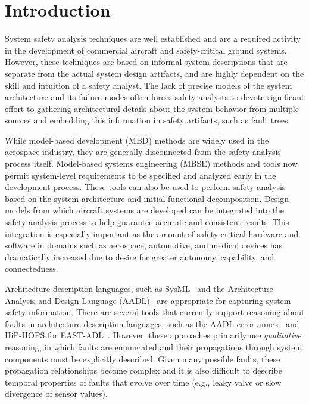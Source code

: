 \section{Introduction}

System safety analysis techniques are well established and are a required activity in the development of commercial aircraft and safety-critical ground systems. However, these techniques are based on informal system descriptions that are separate from the actual system design artifacts, and are highly dependent on the skill and intuition of a safety analyst. The lack of precise models of the system architecture and its failure modes often forces safety analysts to devote significant effort to gathering architectural details about the system behavior from multiple sources and embedding this information in safety artifacts, such as fault trees.

While model-based development (MBD) methods are widely used in the aerospace industry, they are generally disconnected from the safety analysis process itself. Model-based systems engineering (MBSE) methods and tools  now permit system-level requirements to be specified and analyzed early in the development process. These tools can also be used to perform safety analysis based on the system architecture and initial functional decomposition. Design models from which aircraft systems are developed can be integrated into the safety analysis process to help guarantee accurate and consistent results. This integration is especially important as the amount of safety-critical hardware and software in domains such as aerospace, automotive, and medical devices has dramatically increased due to desire for greater autonomy, capability, and connectedness.

Architecture description languages, such as SysML~\cite{} and the Architecture Analysis and Design Language (AADL)~\cite{} are appropriate for capturing system safety information.  There are several tools that currently support reasoning about faults in architecture description languages, such as the AADL error annex~\cite{} and HiP-HOPS for EAST-ADL~\cite{}.  However, these approaches primarily use {\em qualitative} reasoning, in which faults are enumerated and their propagations through system components must be explicitly described.  Given many possible faults, these propagation relationships become complex and it is also difficult to describe temporal properties of faults that evolve over time (e.g., leaky valve or slow divergence of sensor values).

